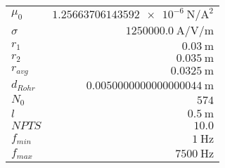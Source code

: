 
{%
    \begin{center}
    \label{tab:fitparams:st:freq:approx}
    \begin{tabular}{lr}
    \toprule
        $\mu_0$ & $\SI{1.25663706143592e-6}{\newton\per\ampere\squared}$\\
        $\sigma$ & $\SI{1250000.0}{\ampere\per\volt\per\meter}$\\
        $r_1$ & $\SI{0.03}{\meter}$\\
        $r_2$ & $\SI{0.035}{\meter}$\\
        $r_{avg}$ & $\SI{0.0325}{\meter}$\\
        $d_{Rohr}$ & $\SI{0.0050000000000000044}{\meter}$\\
        $N_0$ & $\num{574}$\\
        $l$ & $\SI{0.5}{\meter}$\\
        $NPTS$ & $\num{10.0}$\\
        $f_{min}$ & $\SI{1}{\hertz}$\\
        $f_{max}$ & $\SI{7500}{\hertz}$\\

    \bottomrule
    \end{tabular}
    \end{center}
}

